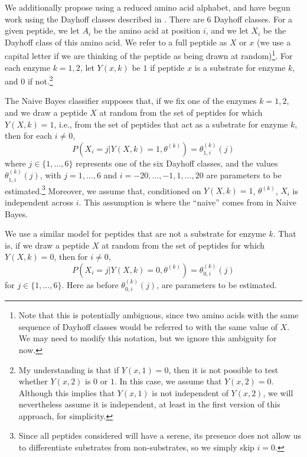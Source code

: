 \documentclass[12pt]{article}
\begin{document}
We additionally propose using a reduced amino acid alphabet, and have begun work using the Dayhoff classes described in \cite{Susko2004}.
There are 6 Dayhoff classes.  For a given peptide, we let $A_i$ be the amino acid at position $i$, and we let $X_i$ be the Dayhoff class of this amino acid.
We refer to a full peptide as $X$ or $x$ (we use a capital letter if we are thinking of the peptide as being drawn at random)\footnote{Note that this is potentially ambiguous, since two amino acids with the same sequence of Dayhoff classes would be referred to with the same value of $X$.  We may need to modify this notation, but we ignore this ambiguity for now.}.
For each enzyme $k=1,2$, let $Y(x,k)$ be $1$ if peptide $x$ is a substrate for enzyme $k$, and $0$ if not.\footnote{My understanding is that if $Y(x,1)=0$, then it is not possible to test whether $Y(x,2)$ is $0$ or $1$.  In this case, we assume that $Y(x,2)=0$.  Although this implies that $Y(x,1)$ is not independent of $Y(x,2)$, we will nevertheless assume it is independent, at least in the first version of this approach, for simplicity.}

The Naive Bayes classifier supposes that, if we fix one of the enzymes $k=1,2$,
and we draw a peptide $X$ at random from the set of peptides for which $Y(X,k)=1$, i.e., from the set of peptides that act as a substrate for enzyme $k$, then
for each $i\ne 0$,
\begin{equation} \label{eq:NB1}
  P\left(X_i = j | Y(X,k)=1, \theta^{(k)}\right) = \theta^{(k)}_{1,i}(j)
\end{equation}
where $j\in\{1,\ldots,6\}$ represents one of the six Dayhoff classes,
and the values $\theta^{(k)}_{1,i}(j)$, with $j=1,\ldots,6$ and $i=-20,\ldots,-1,1,\ldots,20$ are parameters to be estimated.\footnote{Since all peptides considered will have a serene, its presence does not allow us to differentiate substrates from non-substrates, so we simply skip $i=0$.}
Moreover, we assume that, conditioned on $Y(X,k)=1$, $\theta^{(k)}$, $X_i$ is independent across $i$.
This assumption is where the ``naive'' comes from in Naive Bayes.

We use a similar model for peptides that are not a substrate for enzyme $k$.
That is,
if we draw a peptide $X$ at random from the set of peptides for which $Y(X,k)=0$, then for $i\ne 0$,
\begin{equation} \label{eq:NB0}
  P\left(X_i = j | Y(X,k)=0, \theta^{(k)}\right) = \theta^{(k)}_{0,i}(j)
\end{equation}
for $j\in\{1,\ldots,6\}$.  Here as before $\theta^{(k)}_{0,i}(j)$, are parameters to be estimated.
\end{document}
